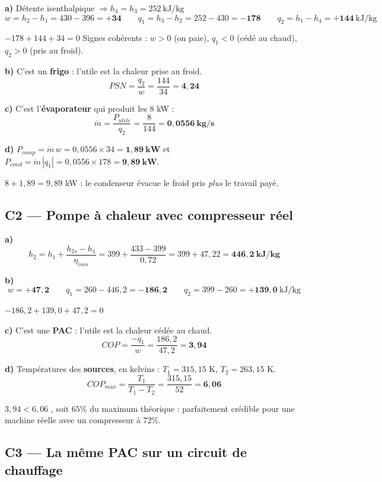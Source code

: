 \documentclass[11pt,a4paper]{article}
\newcommand{\eqb}[1]{\[\boxed{#1}\]}
\begin{document}
\textbf{a)} Détente isenthalpique $\Rightarrow \boxed{h_4=h_3=252\ \text{kJ/kg}}$
\[w=h_2-h_1=430-396=\mathbf{+34}\qquad
q_1=h_3-h_2=252-430=\mathbf{-178}\qquad
q_2=h_1-h_4=\mathbf{+144}\ \text{kJ/kg}\]
\begin{verif}
$-178+144+34=0$ \checkmark \quad Signes cohérents : $w>0$ (on paie), $q_1<0$ (cédé au chaud),
$q_2>0$ (pris au froid).
\end{verif}

\textbf{b)} C'est un \textbf{frigo} : l'utile est la chaleur prise au froid.
\eqb{PSN=\frac{q_2}{w}=\frac{144}{34}=\mathbf{4{,}24}}

\textbf{c)} C'est l'\textbf{évaporateur} qui produit les 8 kW :
\[\dot m=\frac{P_{utile}}{q_2}=\frac{8}{144}=\mathbf{0{,}0556\ \text{kg/s}}\]

\textbf{d)} $P_{comp}=\dot m\,w=0{,}0556\times34=\mathbf{1{,}89\ \text{kW}}$ et
$P_{cond}=\dot m\,|q_1|=0{,}0556\times178=\mathbf{9{,}89\ \text{kW}}$.
\begin{verif}
$8+1{,}89=9{,}89$ kW \checkmark : le condenseur évacue le froid pris \emph{plus} le travail payé.
\end{verif}

\subsection{C2 --- Pompe à chaleur avec compresseur réel}

\textbf{a)} \[h_2=h_1+\frac{h_{2s}-h_1}{\eta_{isos}}=399+\frac{433-399}{0{,}72}
=399+47{,}22=\mathbf{446{,}2\ \text{kJ/kg}}\]

\textbf{b)} \[w=\mathbf{+47{,}2}\qquad q_1=260-446{,}2=\mathbf{-186{,}2}\qquad
q_2=399-260=\mathbf{+139{,}0}\ \text{kJ/kg}\]
\begin{verif}$-186{,}2+139{,}0+47{,}2=0$ \checkmark\end{verif}

\textbf{c)} C'est une \textbf{PAC} : l'utile est la chaleur cédée au chaud.
\eqb{COP=\frac{-q_1}{w}=\frac{186{,}2}{47{,}2}=\mathbf{3{,}94}}

\textbf{d)} Températures des \textbf{sources}, en kelvins : $T_1=315{,}15$ K, $T_2=263{,}15$ K.
\[COP_{max}=\frac{T_1}{T_1-T_2}=\frac{315{,}15}{52}=\mathbf{6{,}06}\]
\begin{verif}
$3{,}94<6{,}06$ \checkmark, soit $65\%$ du maximum théorique : parfaitement crédible pour une
machine réelle avec un compresseur à $72\%$.
\end{verif}

\subsection{C3 --- La même PAC sur un circuit de chauffage}
\end{document}
